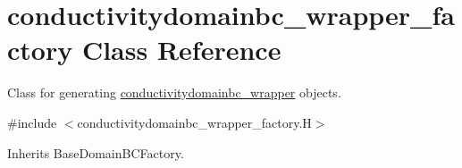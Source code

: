 \hypertarget{classconductivitydomainbc__wrapper__factory}{}\section{conductivitydomainbc\+\_\+wrapper\+\_\+factory Class Reference}
\label{classconductivitydomainbc__wrapper__factory}


Class for generating \hyperlink{classconductivitydomainbc__wrapper}{conductivitydomainbc\+\_\+wrapper} objects.  




{\ttfamily \#include $<$conductivitydomainbc\+\_\+wrapper\+\_\+factory.\+H$>$}



Inherits Base\+Domain\+B\+C\+Factory.

